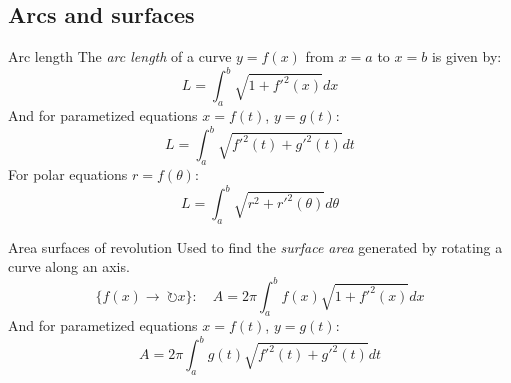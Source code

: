 \subsection{Arcs and surfaces}
\begin{theorem}
    {Arc length}
    The \emph{arc length} of a curve $y=f(x)$ from $x=a$ to $x=b$ is given by:
    \[L=\int_{a}^{b}\sqrt{1+f'^2(x)}dx\]
    And for parametized equations $x=f(t)$, $y=g(t)$:
    \[L=\int_{a}^{b}\sqrt{f'^2(t)+g'^2(t)}dt\]
    For polar equations $r=f(\theta)$:
    \[L=\int_{a}^{b}\sqrt{r^2+r'^2(\theta)}d\theta\]
\end{theorem}
\begin{theorem}
    {Area surfaces of revolution}
    Used to find the \emph{surface area} generated by rotating a curve along an axis.
    \[\{f(x)\to\ \circlearrowright x\}:\quad A=2\pi\int_{a}^{b}f(x)\sqrt{1+f'^2(x)}dx\]
    And for parametized equations $x=f(t)$, $y=g(t)$:
    \[A=2\pi\int_{a}^{b}g(t)\sqrt{f'^2(t)+g'^2(t)}dt\]
\end{theorem}